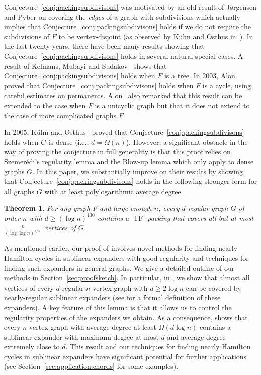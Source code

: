 \documentclass[10pt]{article}
\theoremstyle{plain}
\newtheorem{theorem}{Theorem}
\numberwithin{theorem}{section}
\theoremstyle{definition}
\theoremstyle{remark}
\DeclareMathOperator{\TF}{TF}
\theoremstyle{plain}
\begin{document}
Conjecture~\ref{conj:packingsubdivisons} was motivated by an old result of J{\o}rgensen and Pyber \cite{jorgensen1990covering} on covering the \emph{edges} of a graph with subdivisions which actually implies that Conjecture~\ref{conj:packingsubdivisons} holds if we do not require the subdivisions of $F$ to be vertex-disjoint (as observed by K\"uhn and Osthus in~\cite{kuhn2005packings}). In the last twenty years, there have been many results showing that Conjecture~\ref{conj:packingsubdivisons} holds in several natural special cases. A result of Kelmans, Mubayi and Sudakov~\cite{kelmans2001asymptotically} shows that Conjecture~\ref{conj:packingsubdivisons} holds when $F$ is a tree. In 2003, Alon~\cite{alon2003problems} proved that Conjecture~\ref{conj:packingsubdivisons} holds when $F$ is a cycle, using careful estimates on permanents. Alon~\cite{alon2003problems} also remarked that this result can be extended to the case when $F$ is a unicyclic graph but that it does not extend to the case of more complicated graphs $F$. 

In 2005, K\"uhn and Osthus~\cite{kuhn2005packings} proved that Conjecture~\ref{conj:packingsubdivisons} holds when $G$ is dense (i.e.,  $d = \Omega(n)$).
However, a significant obstacle in the way of proving the conjecture in full generality is that this proof relies on Szemer\'edi’s regularity lemma and the Blow-up lemma which only apply to dense graphs $G$. In this paper, we substantially improve on their results by showing that Conjecture~\ref{conj:packingsubdivisons} holds in the following stronger form for all graphs $G$ with at least polylogarithmic average degree.

\begin{theorem}
\label{thm:packingsubdivisons}
For any graph $F$ and large enough $n$, every $d$-regular graph $G$ of order $n$ with $d \ge (\log n)^{130}$ contains a $\TF$-packing that covers all but at most $\frac{n}{(\log \log n)^{1/30}}$ vertices of $G$.
\end{theorem}

As mentioned earlier, our proof of  involves novel methods for finding nearly Hamilton cycles in sublinear expanders with good regularity and techniques for finding such expanders in general graphs. We give a detailed outline of our methods in Section~\ref{sec:proofsketch}. In particular, in , we show that almost all vertices of every $d$-regular $n$-vertex graph with $d \ge 2 \log n$ can be covered by nearly-regular sublinear expanders (see  for a formal definition of these expanders). A key feature of this lemma is that it allows us to control the regularity properties of the expanders we obtain. As a consequence,  shows that every $n$-vertex graph with average degree at least $\Omega(d \log n)$ contains a sublinear expander with maximum degree at most $d$ and average degree extremely close to $d$. 
This result and our techniques for finding nearly Hamilton cycles in sublinear expanders have significant potential for further applications (see Section~\ref{sec:application:chords} for some examples).
\end{document}
